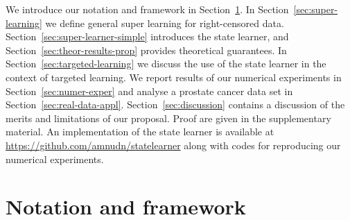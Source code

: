 \documentclass[11pt]{article}
\theoremstyle{thmstyleone}%
\theoremstyle{thmstyletwo}%
\theoremstyle{thmstylethree}%
\newcommand{\1}{\mathds{1}}
\begin{document}
We introduce our notation and framework in Section~\ref{sec:framework}. In
Section~\ref{sec:super-learning} we define general super learning for
right-censored data. Section~\ref{sec:super-learner-simple} introduces the state
learner, and Section~\ref{sec:theor-results-prop} provides theoretical
guarantees. In Section~\ref{sec:targeted-learning} we discuss the use of the
state learner in the context of targeted learning. We report results of our
numerical experiments in Section~\ref{sec:numer-exper} and analyse a prostate
cancer data set in Section~\ref{sec:real-data-appl}.
Section~\ref{sec:discussion} contains a discussion of the merits and limitations
of our proposal. Proof are given in the supplementary material. An
implementation of the state learner is available at
\url{https://github.com/amnudn/statelearner} along with codes for reproducing
our numerical experiments.


\section{Notation and framework}
\label{sec:framework}
\end{document}
